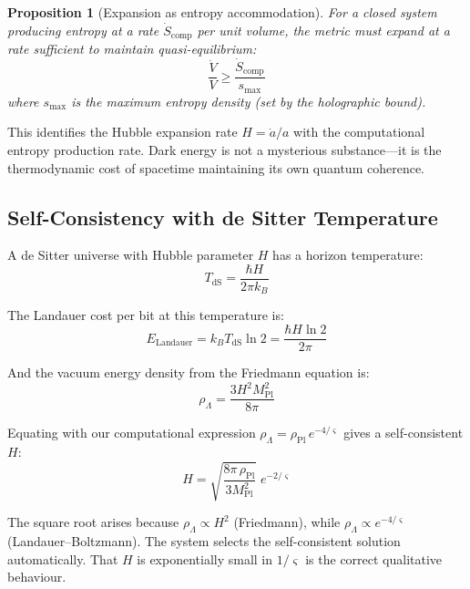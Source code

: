 \documentclass[11pt,a4paper]{article}
\newtheorem{proposition}[theorem]{Proposition}
\theoremstyle{definition}
\newcommand{\strain}{\varsigma}            %
\newcommand{\rhoL}{\rho_{\Lambda}}
\newcommand{\rhoPl}{\rho_{\text{Pl}}}
\newcommand{\TdS}{T_{\text{dS}}}
\begin{document}
\begin{proposition}[Expansion as entropy accommodation]
For a closed system producing entropy at a rate $\dot{S}_{\text{comp}}$ per unit volume, the metric must expand at a rate sufficient to maintain quasi-equilibrium:
\begin{equation}
    \frac{\dot{V}}{V} \geq \frac{\dot{S}_{\text{comp}}}{s_{\max}}
\end{equation}
where $s_{\max}$ is the maximum entropy density (set by the holographic bound).
\end{proposition}

This identifies the Hubble expansion rate $H = \dot{a}/a$ with the computational entropy production rate. Dark energy is not a mysterious substance---it is the thermodynamic cost of spacetime maintaining its own quantum coherence.

\subsection{Self-Consistency with de Sitter Temperature}

A de Sitter universe with Hubble parameter $H$ has a horizon temperature:
\begin{equation}
    \TdS = \frac{\hbar H}{2\pi k_B}
\end{equation}

The Landauer cost per bit at this temperature is:
\begin{equation}
    E_{\text{Landauer}} = k_B \TdS \ln 2 = \frac{\hbar H \ln 2}{2\pi}
\end{equation}

And the vacuum energy density from the Friedmann equation is:
\begin{equation}
    \rhoL = \frac{3H^2 M_{\text{Pl}}^2}{8\pi}
\end{equation}

Equating with our computational expression $\rhoL = \rhoPl \, e^{-4/\strain}$ gives a self-consistent $H$:
\begin{equation}
    H = \sqrt{\frac{8\pi\,\rhoPl}{3 M_{\text{Pl}}^2}} \; e^{-2/\strain}
\end{equation}

The square root arises because $\rhoL \propto H^2$ (Friedmann), while $\rhoL \propto e^{-4/\strain}$ (Landauer--Boltzmann). The system selects the self-consistent solution automatically. That $H$ is exponentially small in $1/\strain$ is the correct qualitative behaviour.


\end{document}
